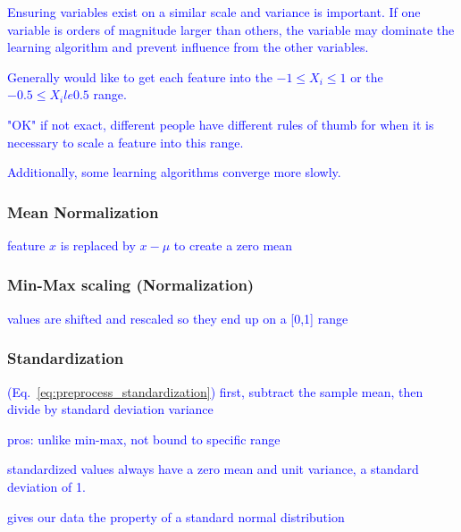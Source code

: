 \textcolor{blue}{Ensuring variables exist on a similar scale and variance is important. If one variable is orders of magnitude larger than others, the variable may dominate the learning algorithm and prevent influence from the other variables.}

\textcolor{blue}{Generally would like to get each feature into the $-1 \le X_i \le 1$ or the $-0.5 \le X_i le 0.5$ range.}

\textcolor{blue}{"OK" if not exact, different people have different rules of thumb for when it is necessary to scale a feature into this range.}

\textcolor{blue}{Additionally, some learning algorithms converge more slowly.}





\subsubsection{Mean Normalization}

\textcolor{blue}{feature $x$ is replaced by $x - \mu$ to create a zero mean}


\subsubsection{Min-Max scaling (Normalization)}

\textcolor{blue}{values are shifted and rescaled so they end up on a [0,1] range}

\subsubsection{Standardization}

\textcolor{blue}{(Eq.~\ref{eq:preprocess_standardization}) first, subtract the sample mean, then divide by standard deviation variance}

\textcolor{blue}{pros: unlike min-max, not bound to specific range}

\textcolor{blue}{standardized values always have a zero mean and unit variance, a standard deviation of 1.}

\textcolor{blue}{gives our data the property of a standard normal distribution}

